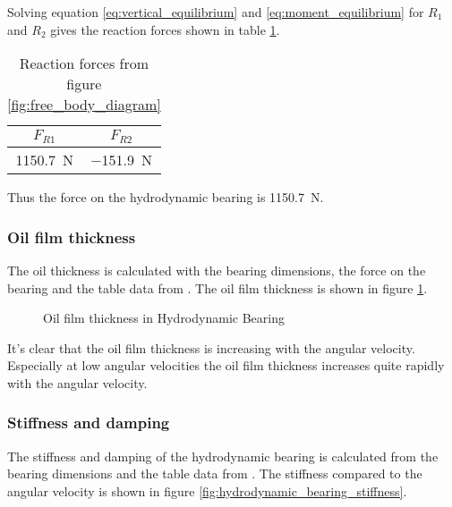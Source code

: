 Solving equation \ref{eq:vertical_equilibrium} and \ref{eq:moment_equilibrium} for $R_1$ and $R_2$ gives the reaction forces shown in table \ref{tab:hydrodynamic_bearing_reactions}.
\begin{table}[ht]
    \centering
    \caption{Reaction forces from figure \ref{fig:free_body_diagram}}
    \label{tab:hydrodynamic_bearing_reactions}
    \begin{tabular}{@{}cc@{}}
        \toprule
        $F_{R1}$    &   $F_{R2}$    \\ \midrule
        \SI{1150.7}{\newton}  &   \SI{-151.9}{\newton}  \\ \bottomrule
    \end{tabular}
\end{table}
Thus the force on the hydrodynamic bearing is \SI{1150.7}{\newton}.

\subsubsection{Oil film thickness}
The oil thickness is calculated with the bearing dimensions, the force on the bearing and the table data from \cite[Table 1a]{Problem}. The oil film thickness is shown in figure \ref{fig:oil_film_thickness}.
\begin{figure}[ht]
    \centering
    
    \caption{Oil film thickness in Hydrodynamic Bearing}
    \label{fig:oil_film_thickness}
\end{figure}
It's clear that the oil film thickness is increasing with the angular velocity. Especially at low angular velocities the oil film thickness increases quite rapidly with the angular velocity.

\subsubsection{Stiffness and damping}
The stiffness and damping of the hydrodynamic bearing is calculated from the bearing dimensions and the table data from \cite[Table 1a]{Problem}. The stiffness compared to the angular velocity is shown in figure \ref{fig:hydrodynamic_bearing_stiffness}.

